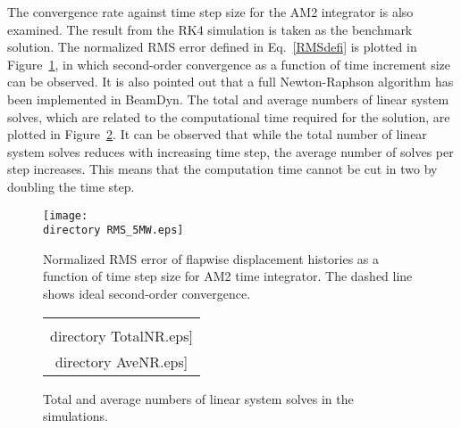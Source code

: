 \documentclass{aiaa-tc}
\def\directory{EPSF/}
\begin{document}
The convergence rate against time step size for the AM2 integrator is also examined. The result from the RK4 simulation is taken as the benchmark solution. The normalized RMS error defined in Eq.~\eqref{RMSdefi} is plotted in Figure~\ref{RMS_5MW}, in which second-order convergence as a function of time increment size can be observed. It is also pointed out that a full Newton-Raphson algorithm has been implemented in BeamDyn. The total and average numbers of linear system solves, which are related to the computational time required for the solution, are plotted in Figure~\ref{E4NR}. It can be observed that while the total number of linear system solves reduces with increasing time step, the average number of solves per step increases.  This means that the computation time cannot be cut in two by doubling the time step.
\begin{figure}
\centering
\texttt{[image: \\directory RMS\_5MW.eps]}
\caption{ Normalized RMS error of flapwise displacement histories as a function of time step size for AM2 time integrator. The dashed line shows ideal second-order convergence.} 
\label{RMS_5MW}
\end{figure}

\begin{figure}
    \centering
    \begin{tabular}{c}
    \subfloat[Total number of linear system solves]{\label{E4NR:Total}\texttt{[image: \\directory  TotalNR.eps]}} \qquad
\subfloat[Average number of linear system solves per step]{\label{E4NR:Average}\texttt{[image: \\directory  AveNR.eps]}} \\
\end{tabular}
\caption{Total and average numbers of linear system solves in the simulations.}
\label{E4NR}
\end{figure} 


\end{document}
